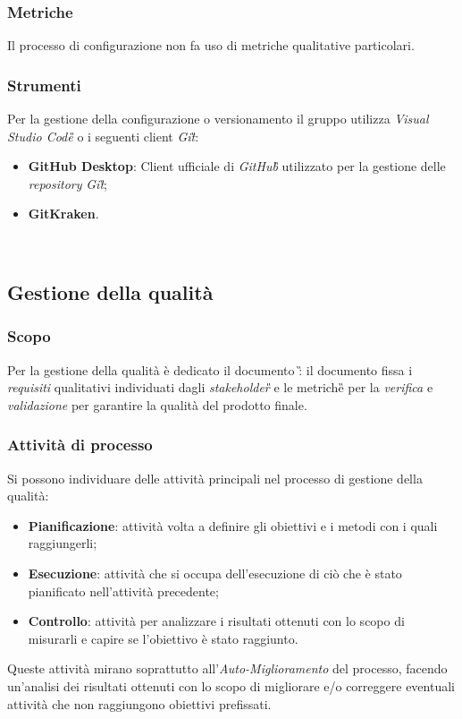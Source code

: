 		\subsubsection{Metriche}
		Il processo di configurazione non fa uso di metriche qualitative particolari.

		\subsubsection{Strumenti}
			Per la gestione della configurazione o versionamento il gruppo utilizza \emph{Visual Studio Code\G{}} o i seguenti client \emph{Git\G}:
				
				\begin{itemize}
					\item \textbf{GitHub Desktop}: Client ufficiale di \emph{GitHub\G{}} utilizzato per la gestione delle \emph{repository} \emph{Git\G};
					\item \textbf{GitKraken}.
				\end{itemize}\
		
		\subsection{Gestione della qualità}
			\subsubsection{Scopo}
				Per la gestione della qualità è dedicato il documento \PdQ{}\G: il documento fissa i \emph{requisiti} qualitativi individuati dagli \emph{stakeholder\G{}} e le metriche\G{} per la \emph{verifica} e \emph{validazione} per garantire la qualità del prodotto finale.
		
			\subsubsection{Attività di processo}
				Si possono individuare delle attività principali nel processo di gestione della qualità:
				\begin{itemize}
					\item \textbf{Pianificazione}: attività volta a definire gli obiettivi e i metodi con i quali raggiungerli;
					\item \textbf{Esecuzione}: attività che si occupa dell'esecuzione di ciò che è stato pianificato nell'attività precedente;
					\item \textbf{Controllo}: attività per analizzare i risultati ottenuti con lo scopo di misurarli e capire se l'obiettivo è stato raggiunto.
				\end{itemize}
				Queste attività mirano soprattutto all'\emph{Auto-Miglioramento} del processo, facendo un'analisi dei risultati ottenuti con lo scopo di migliorare e/o correggere eventuali attività
				che non raggiungono obiettivi prefissati.
			
